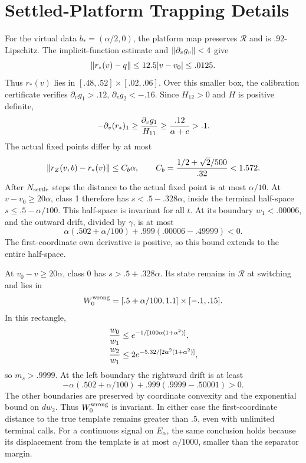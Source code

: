 \section{Settled-Platform Trapping Details}\label{sec:platform_proof}
For the virtual data $b_*=(\alpha/2,0)$, the platform map preserves $\mathcal R$ and is $.92$-Lipschitz. The implicit-function estimate and $\lVert\partial_vg_v\rVert<4$ give
\begin{equation}
\lVert r_*(v)-q\rVert\le12.5|v-v_0|\le.0125.
\end{equation}
Thus $r_*(v)$ lies in $[.48,.52]\times[.02,.06]$. Over this smaller box, the calibration certificate verifies $\partial_vg_1>.12$, $\partial_vg_2<-.16$. Since $H_{12}>0$ and $H$ is positive definite,
\begin{equation}
-\partial_v(r_*)_1\ge{\partial_vg_1\over H_{11}}
\ge{.12\over\alpha+c}>.1.
\end{equation}
The actual fixed points differ by at most
\begin{equation}
\lVert r_Z(v,b)-r_*(v)\rVert\le C_b\alpha,\qquad
C_b={1/2+\sqrt2/500\over.32}<1.572.
\end{equation}
After $N_{\rm settle}$ steps the distance to the actual fixed point is at most $\alpha/10$. At $v-v_0\ge20\alpha$, class 1 therefore has $s<.5-.328\alpha$, inside the terminal half-space $s\le.5-\alpha/100$. This half-space is invariant for all $t$. At its boundary $w_1<.00006$, and the outward drift, divided by $\gamma$, is at most
\begin{equation}
\alpha(.502+\alpha/100)+.999(.00006-.49999)<0.
\end{equation}
The first-coordinate own derivative is positive, so this bound extends to the entire half-space.

At $v_0-v\ge20\alpha$, class 0 has $s>.5+.328\alpha$. Its state remains in $\mathcal R$ at switching and lies in
\begin{equation}
W_0^{\rm wrong}=[.5+\alpha/100,1.1]\times[-.1,.15].
\end{equation}
In this rectangle,
\begin{align}
{w_0\over w_1}&\le e^{-1/[100\alpha(1+\alpha^2)]},\\
{w_2\over w_1}&\le2e^{-5.32/[2\alpha^2(1+\alpha^2)]},
\end{align}
so $m_s>.9999$. At the left boundary the rightward drift is at least
\begin{equation}
-\alpha(.502+\alpha/100)+.999(.9999-.50001)>0.
\end{equation}
The other boundaries are preserved by coordinate convexity and the exponential bound on $dw_2$. Thus $W_0^{\rm wrong}$ is invariant. In either case the first-coordinate distance to the true template remains greater than $.5$, even with unlimited terminal calls. For a continuous signal on $E_\alpha$, the same conclusion holds because its displacement from the template is at most $\alpha/1000$, smaller than the separator margin.
